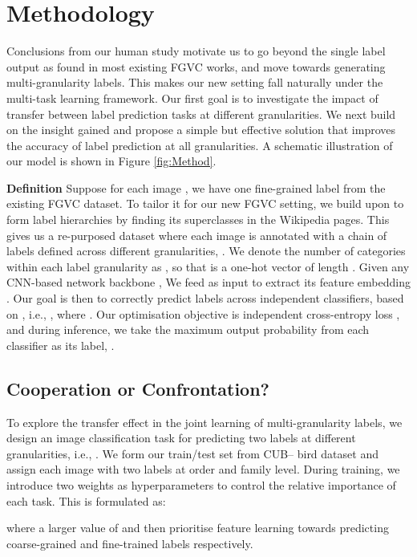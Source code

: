 \documentclass[final]{cvpr}
\newcommand{\keypoint}[1]{\vspace{0.05cm}\noindent\textbf{#1}\quad}
\begin{document}
\section{Methodology}

Conclusions from our human study motivate us to go beyond the single label output as found in most existing FGVC works, and move towards generating multi-granularity labels. This makes our new setting fall naturally under the multi-task learning framework. Our first goal is to investigate the impact of transfer between label prediction tasks at different granularities. We next build on the insight gained and propose a simple but effective solution that improves the accuracy of label prediction at all granularities. A schematic illustration of our model is shown in Figure \ref{fig:Method}.

\keypoint{Definition} Suppose for each image , we have one fine-grained label  from the existing FGVC dataset. To tailor it for our new FGVC setting, we build upon  to form  label hierarchies by finding its superclasses in the Wikipedia pages. This gives us a re-purposed dataset where each image  is annotated with a chain of  labels defined across different granularities, . We denote the number of categories within each label granularity as , so that  is a one-hot vector of length . Given any CNN-based network backbone , We feed  as input to extract its feature embedding {}. Our goal is then to correctly predict labels across  independent classifiers,  based on , i.e., , where . Our optimisation objective is  independent cross-entropy loss , and during inference, we take the maximum output probability from each classifier as its label, .




\subsection{Cooperation or Confrontation?}\label{Cooperation_or_Confrontation}


To explore the transfer effect in the joint learning of multi-granularity labels, we design an image classification task for predicting two labels at different granularities, i.e., . We form our train/test set from CUB-- bird dataset and assign each image with two labels at order and family level. During training, we introduce two weights as hyperparameters to control the relative importance of each task. This is formulated as:


\noindent where a larger value of  and  then prioritise feature learning towards predicting coarse-grained and fine-trained labels respectively.
\end{document}
